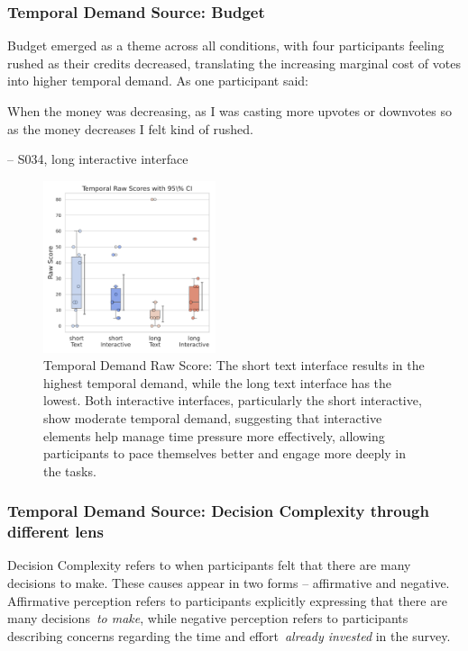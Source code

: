\subsubsection{Temporal Demand Source: Budget}
Budget emerged as a theme across all conditions, with four participants feeling rushed as their credits decreased, translating the increasing marginal cost of votes into higher temporal demand. As one participant said:

\begin{displayquote}
When the money was decreasing, as I was casting more upvotes or downvotes so as the money decreases I felt kind of rushed.
            
\noindent \hfill -- S034, long interactive interface
\end{displayquote}


\begin{figure} %
    \centering
    \includegraphics[width=0.45\textwidth, trim=0 13 0 13, clip]{content/image/cog/Temporal_scores.pdf}
    \captionsetup{width=0.40\textwidth, justification=justified} %
    \caption{Temporal Demand Raw Score: The short text interface results in the highest temporal demand, while the long text interface has the lowest. Both interactive interfaces, particularly the short interactive, show moderate temporal demand, suggesting that interactive elements help manage time pressure more effectively, allowing participants to pace themselves better and engage more deeply in the tasks.}
    \label{fig:temporal_cog_score}
\end{figure}

\subsubsection{Temporal Demand Source: Decision Complexity through different lens}
Decision Complexity refers to when participants felt that there are many decisions to make. These causes appear in two forms -- affirmative and negative. Affirmative perception refers to participants explicitly expressing that there are many decisions~\textit{to make}, while negative perception refers to participants describing concerns regarding the time and effort~\textit{already invested} in the survey.

